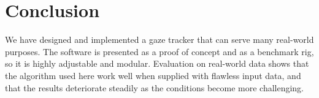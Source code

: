 \chapter*{Conclusion}

We have designed and implemented a gaze tracker that can serve many real-world purposes.
The software is presented as a proof of concept and as a benchmark rig, so it is highly adjustable and modular.
Evaluation on real-world data shows that the algorithm used here work well when supplied with flawless input data, and that the results deteriorate steadily as the conditions become more challenging.
